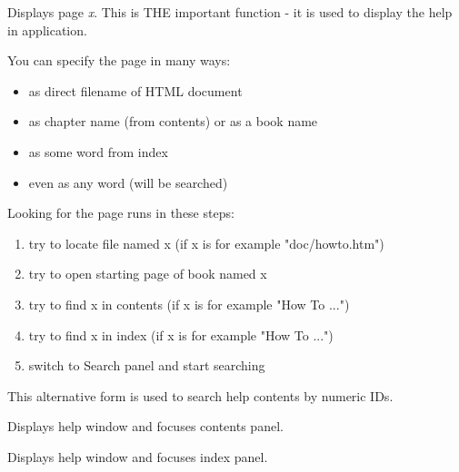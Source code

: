
Displays page {\it x}. This is THE important function - it is used to display
the help in application.

You can specify the page in many ways:

\begin{itemize}\itemsep=0pt
\item as direct filename of HTML document
\item as chapter name (from contents) or as a book name
\item as some word from index
\item even as any word (will be searched)
\end{itemize}

Looking for the page runs in these steps:

\begin{enumerate}\itemsep=0pt
\item try to locate file named x (if x is for example "doc/howto.htm")
\item try to open starting page of book named x
\item try to find x in contents (if x is for example "How To ...")
\item try to find x in index (if x is for example "How To ...")
\item switch to Search panel and start searching
\end{enumerate}


This alternative form is used to search help contents by numeric IDs.


\label{wxhtmlhelpcontrollerdisplaycontents}


Displays help window and focuses contents panel.

\label{wxhtmlhelpcontrollerdisplayindex}


Displays help window and focuses index panel.

\label{wxhtmlhelpcontrollerkeywordsearch}


